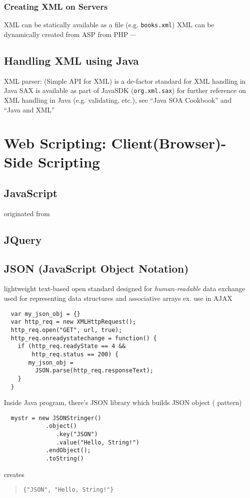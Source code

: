 \documentclass{myproc}
\begin{document}
\subsubsection{Creating XML on Servers}
\bit
\w XML can be statically available as a file (e.g. {\verb+books.xml+})
\w XML can be dynamically created
  \bit
  \w from ASP
  \w from PHP
  \w $\cdots$
  \eit
\eit

\subsection{Handling XML using Java}
\bit
\w XML parser:  (Simple API for XML) is a de-factor standard for XML handling in Java
\w SAX is available as part of JavaSDK (\verb+org.xml.sax+)
\w for further reference on XML handling in Java (e.g. validating, etc.), see ``{\bb{}Java SOA Cookbook}'' and ``{\bb{}Java and XML}''
\eit

\section{Web Scripting: Client(Browser)-Side Scripting}
\subsection{JavaScript}
\bit
\w originated from 
\eit
\subsection{JQuery}
\subsection{JSON (JavaScript Object Notation)}
\bit
\w lightweight text-based open standard designed for {\em human-readable\/}
data exchange
\w used for representing data structures and associative arrays
\w ex. use in AJAX
  {
  \begin{verbatim}
  var my_json_obj = {}
  var http_req = new XMLHttpRequest();
  http_req.open("GET", url, true);
  http_req.onreadystatechange = function() {
    if (http_req.readyState == 4 && 
        http_req.status == 200) {
       my_json_obj = 
         JSON.parse(http_req.responseText);
    }
  }
  \end{verbatim}
  }
\w Inside Java program, there's JSON library which builds JSON object
( pattern)
  \begin{verbatim}
  mystr = new JSONStringer()
            .object()
               .key("JSON")
               .value("Hello, String!")
            .endObject();
            .toString()
  \end{verbatim}
  creates 
\begin{quote}
  \verb+{"JSON", "Hello, String!"}+
\end{quote}
\eit
\end{document}
